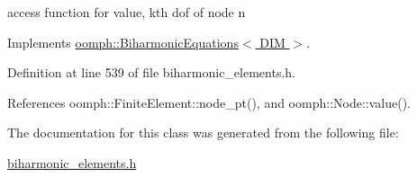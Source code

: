access function for value, kth dof of node n 



Implements \hyperlink{classoomph_1_1BiharmonicEquations_aebe4e72a90f24cde0f34cf14287e3721}{oomph\+::\+Biharmonic\+Equations$<$ D\+I\+M $>$}.



Definition at line 539 of file biharmonic\+\_\+elements.\+h.



References oomph\+::\+Finite\+Element\+::node\+\_\+pt(), and oomph\+::\+Node\+::value().



The documentation for this class was generated from the following file\+:\begin{DoxyCompactItemize}
\item 
\hyperlink{biharmonic__elements_8h}{biharmonic\+\_\+elements.\+h}\end{DoxyCompactItemize}
